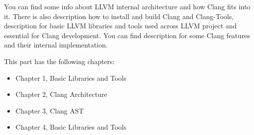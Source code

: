 

You can find some info about LLVM internal architecture and how Clang fits into it. There is also description how to install and build Clang and Clang-Tools, description for basic LLVM libraries and tools used across LLVM project and essential for Clang development. You can find description for some Clang features and their internal implementation.

This part has the following chapters:

\begin{itemize}
\item
Chapter 1, Basic Libraries and Tools

\item
Chapter 2, Clang Architecture

\item
Chapter 3, Clang AST

\item
Chapter 4, Basic Libraries and Tools
\end{itemize}

